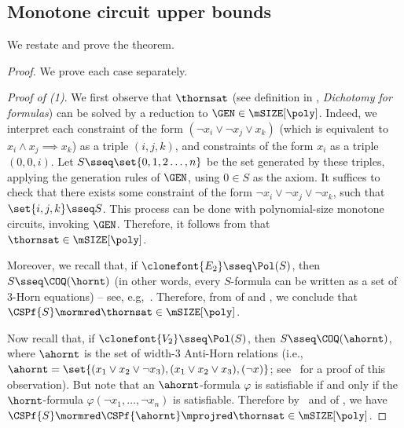 \documentclass[11pt]{article}
\begin{document}
\subsection{Monotone circuit upper bounds}
\label{sec:monotone_upper}





We restate and prove the theorem.

\monschaeffer*

\begin{proof}
    We prove each case separately.

    \emph{Proof of (1)}.
    We first observe that
    $\thornsat$ 
    (see definition in , \emph{Dichotomy for formulas})
    can be solved by a reduction to
    $\GEN \in \mSIZE[\poly]$.
    Indeed, we interpret each constraint of the form
    $(\neg x_i \lor \neg x_j \lor x_k)$
    (which is equivalent to 
    $x_i \land x_j \implies x_k$)
    as a triple
    $(i,j,k)$,
    and constraints of the form
    $x_i$
    as a triple
    $(0,0,i)$.
    Let $S \sseq \set{0,1,2\dots,n}$ be the set generated
    by these triples, applying the generation rules of $\GEN$,
    using $0 \in S$ as the axiom.
    It suffices to check that there exists
    some constraint of the form
    $\neg x_i \lor \neg x_j \lor \neg x_k$,
    such that $\set{i,j,k} \sseq S$.
    This process can be done with polynomial-size
    monotone circuits, invoking $\GEN$.
    Therefore, it follows
    from 
    that
    $\thornsat \in \mSIZE[\poly]$.

    Moreover, we recall that, if $\clonefont{E_2} \sseq \Pol(S)$, then
    $S \sseq \COQ(\hornt)$
    (in other words, every $S$-formula can be written as a set of 3-Horn
    equations) -- see, e.g,~\cite[Lemma 4.8]{DBLP:books/daglib/0004131}.
    Therefore, from 
     of 
    and
    ,
    we conclude that
    $\CSPf{S} \mormred \thornsat \in \mSIZE[\poly]$.

    Now recall that, if $\clonefont{V_2} \sseq \Pol(S)$,
    then
    $S \sseq \COQ(\ahornt)$,
    where
    $\ahornt$ is the set of width-3 Anti-Horn relations
    (i.e., $\ahornt = 
    \set{
        (x_1 \lor x_2 \lor \neg x_3),
        (x_1 \lor x_2 \lor x_3),
        (\neg x)
    }$; see~\cite[Lemma 4.8]{DBLP:books/daglib/0004131} for a proof of this
    observation).
    But note that an
    $\ahornt$-formula $\varphi$
    is satisfiable if and only if
    the $\hornt$-formula 
    $\varphi(\neg x_1,\dots,\neg x_n)$
    is satisfiable.
    Therefore by~
    and
     of ,
    we have
    $\CSPf{S} \mormred 
    \CSPf{\ahornt}
    \mprojred \thornsat \in \mSIZE[\poly]$.


\end{proof}
\end{document}
